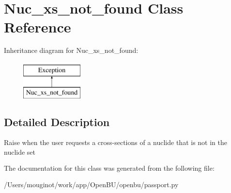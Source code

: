\hypertarget{classopenbu_1_1passport_1_1_nuc__xs__not__found}{}\section{Nuc\+\_\+xs\+\_\+not\+\_\+found Class Reference}
\label{classopenbu_1_1passport_1_1_nuc__xs__not__found}
Inheritance diagram for Nuc\+\_\+xs\+\_\+not\+\_\+found\+:\begin{figure}[H]
\begin{center}
\leavevmode
\includegraphics[height=2.000000cm]{classopenbu_1_1passport_1_1_nuc__xs__not__found}
\end{center}
\end{figure}


\subsection{Detailed Description}
\begin{DoxyVerb}Raise when the user requests a cross-sections of a nuclide that is not in the nuclide set \end{DoxyVerb}
 

The documentation for this class was generated from the following file\+:\begin{DoxyCompactItemize}
\item 
/\+Users/mouginot/work/app/\+Open\+B\+U/openbu/passport.\+py\end{DoxyCompactItemize}
